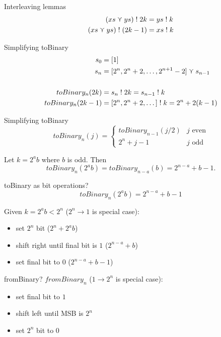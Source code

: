 \documentclass[xcolor={usenames,dvipsnames,svgnames,table},12pt]{beamer}
\newenvironment{xframe}[1][]
  {\begin{frame}[fragile,environment=xframe,#1]}
  {\end{frame}}
\begin{document}
\begin{xframe}{Interleaving lemmas}
  \begin{align*}
    (xs \merge ys)\; ! \; 2k &= ys\;!\;k \\
    (xs \merge ys)\; ! \; (2k - 1) &= xs\;!\;k
  \end{align*}
\end{xframe}

\begin{xframe}{Simplifying toBinary}
  \begin{align*}
    s_0 &= [1] \\
    s_n &= [2^n, 2^n + 2, \dots, 2^{n+1}-2] \merge s_{n-1} \\ \\
    toBinary_n(2k)   &= s_n\;!\;2k = s_{n-1}\;!\;k \\
    toBinary_n(2k-1) &= [2^n, 2^n + 2, \dots]\;!\; k = 2^n + 2(k-1)
  \end{align*}
   \bigskip
\end{xframe}

\begin{xframe}{Simplifying toBinary}
    \[ \mathit{toBinary}_n(j) = \begin{cases}
        \mathit{toBinary}_{n-1}(j/2) & \text{$j$ even} \\ 2^n + j - 1
        & \text{$j$ odd} \end{cases} \] \bigskip

  Let $k = 2^a b$ where $b$ is odd.  Then
  \[ \mathit{toBinary}_n(2^a b) = \mathit{toBinary}_{n-a}(b) =
    2^{n-a} + b - 1. \]
\end{xframe}

\begin{xframe}{toBinary as bit operations?}
  \[ \mathit{toBinary}_n(2^a b) = 2^{n-a} + b - 1 \]

  Given $k = 2^a b < 2^n$ ($2^n \to 1$ is special case):
  \begin{itemize}
  \item set $2^n$ bit ($2^n + 2^a b$)
  \item shift right until final bit is $1$  ($2^{n-a} + b$)
  \item set final bit to $0$ ($2^{n-a} + b - 1$)
  \end{itemize} \bigskip


\end{xframe}

\begin{xframe}{fromBinary?}
  $\mathit{fromBinary}_n$ ($1 \to 2^n$ is special case):
  \begin{itemize}
  \item set final bit to $1$
  \item shift left until MSB is $2^n$
  \item set $2^n$ bit to 0
  \end{itemize}
\end{xframe}
\end{document}
